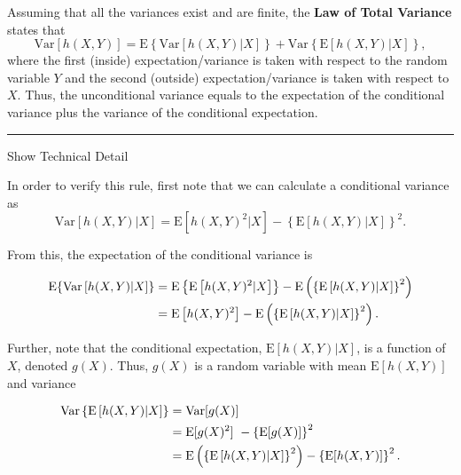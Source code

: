 \documentclass[]{book}
\theoremstyle{definition}
\theoremstyle{definition}
\theoremstyle{definition}
\theoremstyle{remark}
\begin{document}
Assuming that all the variances exist and are finite, the \textbf{Law of
Total Variance} states that
\[\mathrm{Var}[h(X,Y)]= \mathrm{E} \left\{ \mathrm{Var} \left[h(X,Y) | X \right] \right \}
    +\mathrm{Var} \left\{ \mathrm{E} \left[ h(X,Y) | X \right] \right \},\]
where the first (inside) expectation/variance is taken with respect to
the random variable \(Y\) and the second (outside) expectation/variance
is taken with respect to \(X\). Thus, the unconditional variance equals
to the expectation of the conditional variance plus the variance of the
conditional expectation.

\begin{center}\rule{0.5\linewidth}{\linethickness}\end{center}

Show Technical Detail

\hypertarget{EXM:S2a:LTV}{}
In order to verify this rule, first note that we can calculate a
conditional variance as
\[\mathrm{Var} \left[ h(X,Y) | X \right]  = \mathrm{E} [ h(X,Y)^2 | X ] -\left\{\mathrm{E} \left[ h(X,Y) | X \right] \right\}^2.\]

From this, the expectation of the conditional variance is

\begin{align}
    \mathrm{E}\{\mathrm{Var} \left[ h(X,Y) | X \right] \} &=
    \mathrm{E}\left\{\mathrm{E} \left[ h(X,Y)^2 | X \right] \right\} - \mathrm{E}\left(\left\{\mathrm{E} \left[ h(X,Y) | X \right] \right\}^2\right) \notag \\
    &=\mathrm{E} \left[ h(X,Y)^2\right] - \mathrm{E}\left(\left\{\mathrm{E} \left[ h(X,Y) | X \right] \right\}^2\right).\label{eq:AppBEV1}
\end{align}

Further, note that the conditional expectation,
\(\mathrm{E} \left[ h(X,Y) | X \right]\), is a function of \(X\),
denoted \(g(X)\). Thus, \(g(X)\) is a random variable with mean
\(\mathrm{E}[h(X,Y)]\) and variance

\begin{align}
    \mathrm{Var} \left\{ \mathrm{E} \left[ h(X,Y) | X \right] \right \} &=\mathrm{Var}[g(X)]  \notag \\
    &= \mathrm{E}[g(X)^2]\ - \left\{\mathrm{E}[g(X)]\right\}^2 \nonumber\\
    &= \mathrm{E}\left(\left\{\mathrm{E} \left[ h(X,Y) | X \right] \right\}^2\right)
    - \left\{\mathrm{E}[h(X,Y)]\right\}^2.\label{eq:AppBVE2}
\end{align}
\end{document}
